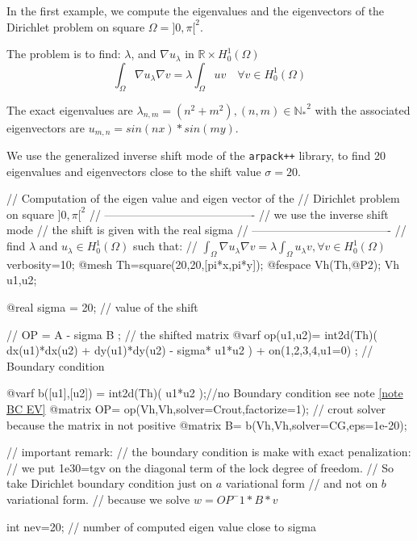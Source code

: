 \documentclass[a4paper,twoside,12pt]{book}
\begin{document}
\begin{example}
\label{exm:lapEigenValue}
In the first example, we compute   the eigenvalues and the eigenvectors of the
 Dirichlet problem  on square $\Omega=]0,\pi[^2$.

The problem is to find:   $\lambda$, and $\nabla u_{\lambda}$  in $\mathbb{R}{\times} H^1_0(\Omega)$
$$ \int_\Omega \nabla u_{\lambda} \nabla v = \lambda \int_\Omega u  v \quad  \forall v \in H^1_0(\Omega)$$

The exact
eigenvalues are $\lambda_{n,m} =(n^2+m^2), (n,m)\in {\mathbb{N}_*}^2$ with
the associated eigenvectors are  $  u_{{m,n}}=sin(nx)*sin(my)$.



We use the generalized inverse shift mode of the \texttt{arpack++} library, to find
20 eigenvalues and eigenvectors close to the shift value $\sigma=20$.

\bFF
//  Computation of the eigen value and eigen vector of the \hfilll
//  Dirichlet problem  on square $]0,\pi[^2$ \hfilll
// ----------------------------------------\hfilll
// we use the inverse shift mode \hfilll
// the shift is given with the real sigma\hfilll
// -------------------------------------\hfilll
//  find $\lambda$ and $u_\lambda\in H^1_0(\Omega)$ such that: \hfilll
// \hfilll$\displaystyle  \int_{\Omega}  \nabla u_{\lambda} \nabla v = \lambda \int_{\Omega} u_{\lambda}   v , \forall v \in H^1_0(\Omega) $\hfilll
verbosity=10;
@mesh Th=square(20,20,[pi*x,pi*y]);
@fespace Vh(Th,@P2);
Vh u1,u2;

@real sigma = 20;  // value of the shift

// OP = A - sigma B ;  //  the shifted matrix
@varf  op(u1,u2)= int2d(Th)(  dx(u1)*dx(u2) + dy(u1)*dy(u2) - sigma* u1*u2 )
                    +  on(1,2,3,4,u1=0) ;  // Boundary condition

@varf b([u1],[u2]) = int2d(Th)(  u1*u2 );//no Boundary condition see note \ref{note BC EV}
@matrix OP= op(Vh,Vh,solver=Crout,factorize=1);  // crout solver because the matrix in not positive
@matrix B= b(Vh,Vh,solver=CG,eps=1e-20);

// important remark:
// the boundary condition is make with exact penalization:
//     we put 1e30=tgv  on the diagonal term of the lock degree of freedom.
//  So take Dirichlet boundary condition just on $a$ variational form
// and not on  $b$ variational form.
// because we solve $ w=OP^-1*B*v $

int nev=20;  // number of computed eigen value close to sigma


\end{example}
\end{document}
